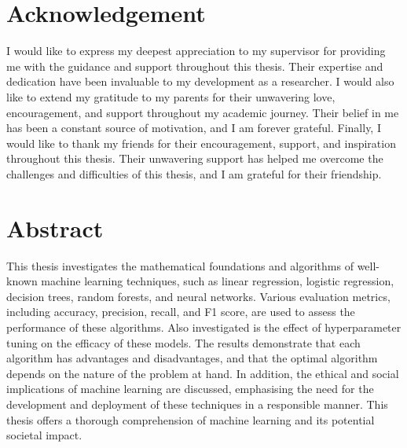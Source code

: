 \documentclass{article}[12pt]
\theoremstyle{definition}
\begin{document}

\section*{Acknowledgement}

\bigskip

I would like to express my deepest appreciation to my supervisor for providing me with the guidance and support throughout this thesis. Their expertise and dedication have been invaluable to my development as a researcher. I would also like to extend my gratitude to my parents for their unwavering love, encouragement, and support throughout my academic journey. Their belief in me has been a constant source of motivation, and I am forever grateful. Finally, I would like to thank my friends for their encouragement, support, and inspiration throughout this thesis. Their unwavering support has helped me overcome the challenges and difficulties of this thesis, and I am grateful for their friendship.

\newpage

\tableofcontents

\newpage

\section*{Abstract}

\bigskip

This thesis investigates the mathematical foundations and algorithms of well-known machine learning techniques, such as linear regression, logistic regression, decision trees, random forests, and neural networks. Various evaluation metrics, including accuracy, precision, recall, and F1 score, are used to assess the performance of these algorithms. Also investigated is the effect of hyperparameter tuning on the efficacy of these models. The results demonstrate that each algorithm has advantages and disadvantages, and that the optimal algorithm depends on the nature of the problem at hand. In addition, the ethical and social implications of machine learning are discussed, emphasising the need for the development and deployment of these techniques in a responsible manner. This thesis offers a thorough comprehension of machine learning and its potential societal impact.
\end{document}
